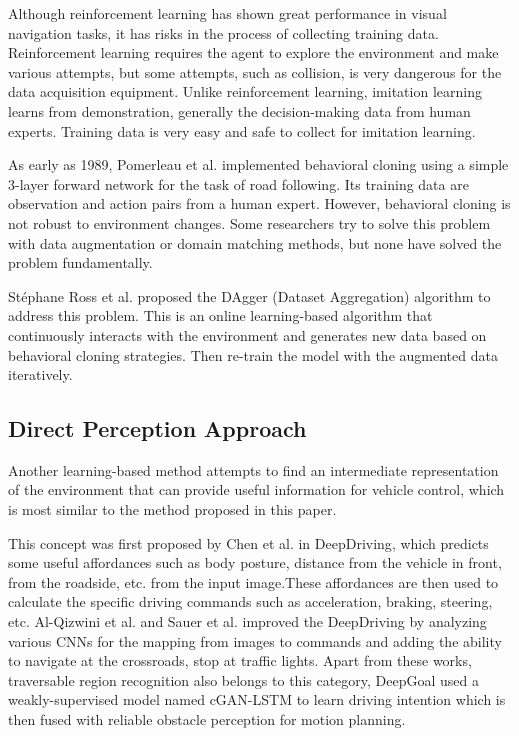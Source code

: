 \documentclass[letterpaper,10 pt,conference]{ieeeconf}  %
\begin{document}
Although reinforcement learning has shown great performance in visual navigation tasks, it has risks in the process of collecting training data. Reinforcement learning requires the agent to explore the environment and make various attempts, but some attempts, such as collision, is very dangerous for the data acquisition equipment. Unlike reinforcement learning, imitation learning learns from demonstration, generally the decision-making data from human experts. Training data is very easy and safe to collect for imitation learning.

As early as 1989, Pomerleau et al.\cite{23} implemented behavioral cloning using a simple 3-layer forward network for the task of road following. Its training data are observation and action pairs from a human expert. However, behavioral cloning is not robust to environment changes. Some researchers try to solve this problem with data augmentation or domain matching methods\cite{24,25,26,27}, but none have solved the problem fundamentally.

Stéphane Ross et al. proposed the DAgger (Dataset Aggregation) algorithm\cite{28} to address this problem. This is an online learning-based algorithm that continuously interacts with the environment and generates new data based on behavioral cloning strategies. Then re-train the model with the augmented data iteratively.

\subsection{Direct Perception Approach}

Another learning-based method attempts to find an intermediate representation of the environment that can provide useful information for vehicle control, which is most similar to the method proposed in this paper.

This concept was first proposed by Chen et al. in DeepDriving\cite{29}, which predicts some useful affordances such as body posture, distance from the vehicle in front, from the roadside, etc. from the input image.These affordances are then used to calculate the specific driving commands such as acceleration, braking, steering, etc. Al-Qizwini et al.\cite{30} and Sauer et al.\cite{31} improved the DeepDriving by analyzing various CNNs for the mapping from images to commands and adding the ability to navigate at the crossroads, stop at traffic lights. Apart from these works, traversable region recognition also belongs to this category, DeepGoal\cite{32} used a weakly-supervised model named cGAN-LSTM to learn driving intention which is then fused with reliable obstacle perception for motion planning.
\end{document}

